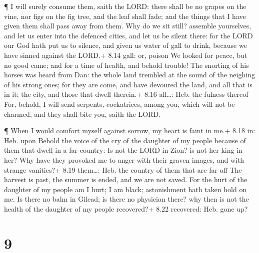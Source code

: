  ¶ I will surely consume them, saith the LORD: there shall
be no grapes on the vine, nor figs on the fig tree, and the leaf shall
fade; and the things that I have given them shall pass away from them.
 Why do we sit still? assemble yourselves, and let us enter
into the defenced cities, and let us be silent there: for the LORD our
God hath put us to silence, and given us water of gall to drink, because
we have sinned against the LORD.+ 8.14 gall: or, poison  We
looked for peace, but no good came; and for a time of health, and behold
trouble!  The snorting of his horses was heard from Dan:
the whole land trembled at the sound of the neighing of his strong ones;
for they are come, and have devoured the land, and all that is in it;
the city, and those that dwell therein.+ 8.16 all\ldots: Heb. the
fulness thereof  For, behold, I will send serpents,
cockatrices, among you, which will not be charmed, and they shall bite
you, saith the LORD.

 ¶ When I would comfort myself against sorrow, my heart is
faint in me.+ 8.18 in: Heb. upon  Behold the voice of the
cry of the daughter of my people because of them that dwell in a far
country: Is not the LORD in Zion? is not her king in her? Why have they
provoked me to anger with their graven images, and with strange
vanities?+ 8.19 them\ldots: Heb. the country of them that are far off
 The harvest is past, the summer is ended, and we are not
saved.  For the hurt of the daughter of my people am I
hurt; I am black; astonishment hath taken hold on me.  Is
there no balm in Gilead; is there no physician there? why then is not
the health of the daughter of my people recovered?+ 8.22 recovered: Heb.
gone up?

\hypertarget{section-8}{%
\section{9}\label{section-8}}

